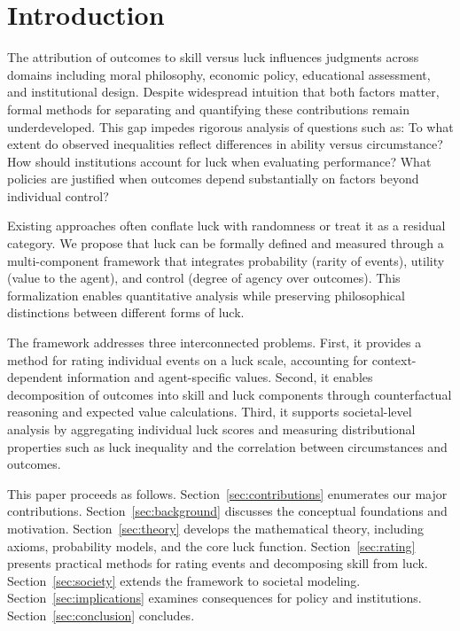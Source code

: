   \setcounter{tocdepth}{1}
  \tableofcontents

  \section{Introduction}

  The attribution of outcomes to skill versus luck influences judgments
  across domains including moral philosophy, economic policy,
  educational assessment, and institutional design. Despite widespread
  intuition that both factors matter, formal methods for separating and quantifying
  these contributions remain underdeveloped. This gap impedes rigorous
  analysis of questions such as: To what extent do observed inequalities
  reflect differences in ability versus circumstance? How should
  institutions account for luck when evaluating performance? What policies
  are justified when outcomes depend substantially on factors beyond individual
  control?

  Existing approaches often conflate luck with randomness or treat it as
  a residual category. We propose that luck can be formally defined and
  measured through a multi-component framework that integrates
  probability (rarity of events), utility (value to the agent), and
  control (degree of agency over outcomes). This formalization enables quantitative
  analysis while preserving philosophical distinctions between different
  forms of luck.

  The framework addresses three interconnected problems. First, it provides
  a method for rating individual events on a luck scale, accounting for
  context-dependent information and agent-specific values. Second, it
  enables decomposition of outcomes into skill and luck components
  through counterfactual reasoning and expected value calculations. Third,
  it supports societal-level analysis by aggregating individual luck
  scores and measuring distributional properties such as luck inequality
  and the correlation between circumstances and outcomes.

  This paper proceeds as follows. Section~\ref{sec:contributions} enumerates
  our major contributions. Section~\ref{sec:background} discusses
  the conceptual foundations and motivation. Section~\ref{sec:theory}
  develops the mathematical theory, including axioms, probability models,
  and the core luck function. Section~\ref{sec:rating} presents
  practical methods for rating events and decomposing skill from luck. Section~\ref{sec:society}
  extends the framework to societal modeling. Section~\ref{sec:implications}
  examines consequences for policy and institutions. Section~\ref{sec:conclusion}
  concludes.

